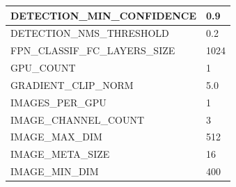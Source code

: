 \begin{longtable}[h]{|l|l|}
	DETECTION\_MIN\_CONFIDENCE      & 0.9                                                                                                                                                                                    \\ \hline
	DETECTION\_NMS\_THRESHOLD       & 0.2                                                                                                                                                                                    \\ \hline
	FPN\_CLASSIF\_FC\_LAYERS\_SIZE  & 1024                                                                                                                                                                                   \\ \hline
	GPU\_COUNT                      & 1                                                                                                                                                                                      \\ \hline
	GRADIENT\_CLIP\_NORM            & 5.0                                                                                                                                                                                    \\ \hline
	IMAGES\_PER\_GPU                & 1                                                                                                                                                                                      \\ \hline
	IMAGE\_CHANNEL\_COUNT           & 3                                                                                                                                                                                      \\ \hline
	IMAGE\_MAX\_DIM                 & 512                                                                                                                                                                                    \\ \hline
	IMAGE\_META\_SIZE               & 16                                                                                                                                                                                     \\ \hline
	IMAGE\_MIN\_DIM                 & 400                                                                                                                                                                                    \\ \hline

\end{longtable}
